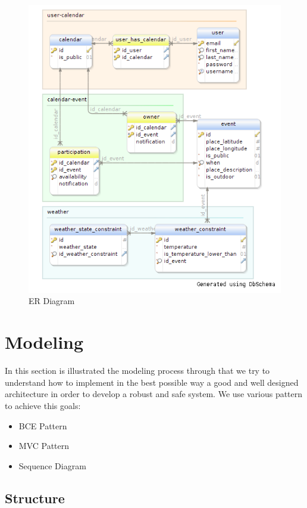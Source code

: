  \begin{center}
 \begin{figure}[H]
    \includegraphics[width=1\textwidth]{../ERDiagram/er/er.png}
    \caption{ER Diagram}
     \label{fig:er}
     \end{figure}
   \end{center}  
\section{Modeling}
In this section is illustrated the modeling process through that we try to understand how to implement in the best possible way a good and well designed architecture in order to develop a robust  and  safe system. We use various pattern to achieve this goals: \begin{itemize}
\item BCE Pattern
\item MVC Pattern
\item Sequence Diagram
\end{itemize}
\subsection{Structure}
